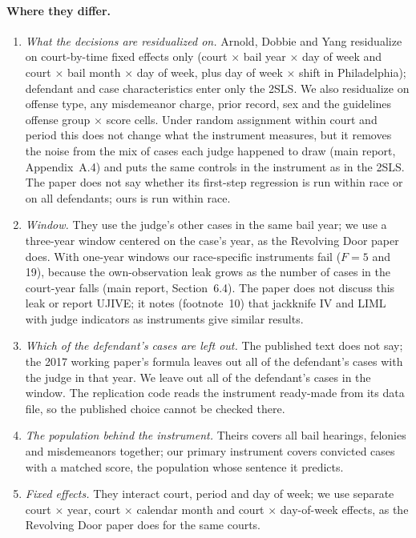 \documentclass[11pt]{article}
\begin{document}
\paragraph{Where they differ.}
\begin{enumerate}
  \item \emph{What the decisions are residualized on.} Arnold, Dobbie and Yang residualize on court-by-time fixed effects only (court $\times$ bail year $\times$ day of week and court $\times$ bail month $\times$ day of week, plus day of week $\times$ shift in Philadelphia); defendant and case characteristics enter only the 2SLS. We also residualize on offense type, any misdemeanor charge, prior record, sex and the guidelines offense group $\times$ score cells. Under random assignment within court and period this does not change what the instrument measures, but it removes the noise from the mix of cases each judge happened to draw (main report, Appendix~A.4) and puts the same controls in the instrument as in the 2SLS. The paper does not say whether its first-step regression is run within race or on all defendants; ours is run within race.
  \item \emph{Window.} They use the judge's other cases in the same bail year; we use a three-year window centered on the case's year, as the Revolving Door paper does. With one-year windows our race-specific instruments fail ($F = 5$ and 19), because the own-observation leak grows as the number of cases in the court-year falls (main report, Section~6.4). The paper does not discuss this leak or report UJIVE; it notes (footnote~10) that jackknife IV and LIML with judge indicators as instruments give similar results.
  \item \emph{Which of the defendant's cases are left out.} The published text does not say; the 2017 working paper's formula leaves out all of the defendant's cases with the judge in that year. We leave out all of the defendant's cases in the window. The replication code reads the instrument ready-made from its data file, so the published choice cannot be checked there.
  \item \emph{The population behind the instrument.} Theirs covers all bail hearings, felonies and misdemeanors together; our primary instrument covers convicted cases with a matched score, the population whose sentence it predicts.
  \item \emph{Fixed effects.} They interact court, period and day of week; we use separate court $\times$ year, court $\times$ calendar month and court $\times$ day-of-week effects, as the Revolving Door paper does for the same courts.

\end{enumerate}
\end{document}
